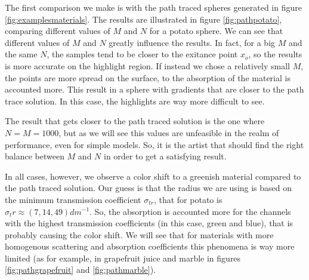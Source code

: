 The first comparison we make is with the path traced spheres generated in figure \ref{fig:examplesmaterials}. The results are illustrated in figure \ref{fig:pathpotato}, comparing different values of $M$ and $N$ for a potato sphere. We can see that different values of $M$ and $N$ greatly influence the results. In fact, for a big $M$ and the same $N$, the samples tend to be closer to the exitance point $x_o$, so the results is more accurate on the highlight region. If instead we chose a relatively small $M$, the points are more spread on the surface, to the absorption of the material is accounted more. This result in a sphere with gradients that are closer to the path trace solution. In this case, the highlights are way more difficult to see. 

The result that gets closer to the path traced solution is the one where $N = M = 1000$, but as we will see this values are unfeasible in the realm of performance, even for simple models. So, it is the artist that should find the right balance between $M$ and $N$ in order to get a satisfying result. 

In all cases, however, we observe a color shift to a greenish material compared to the path traced solution. Our guess is that the radius we are using is based on the minimum transmission coefficient $\sigma_{tr}$, that for potato is $\sigma_tr \approx (7, 14, 49) dm^{-1}$. So, the absorption is accounted more for the channels with the highest transmission coefficients (in this case, green and blue), that is probably causing the color shift. We will see that for materials with more homogenous scattering and absorption coefficients this phenomena is way more limited (as for example, in grapefruit juice and marble in figures  \ref{fig:pathgrapefruit} and \ref{fig:pathmarble}).

